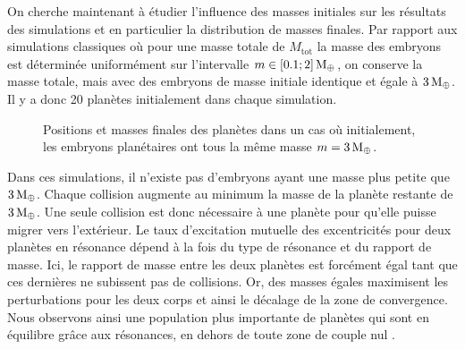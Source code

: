 \bigskip

On cherche maintenant à étudier l'influence des masses initiales sur les résultats des simulations et en particulier la distribution de masses finales. Par rapport aux simulations classiques où pour une masse totale de $M_\text{tot}$ la masse des embryons est déterminée uniformément sur l'intervalle $m\in[0.1 ; 2]\mathrm{\thinspace M_\oplus}$, on conserve la masse totale, mais avec des embryons de masse initiale identique et égale à $3\mathrm{\thinspace M_\oplus}$. Il y a donc 20 planètes initialement dans chaque simulation. 

\begin{figure}[htbp]
\centering
{}\hfill
{}

\caption[Propriétés statistiques quand tous les embryons ont la même masse initialement.]{Positions et masses finales des
planètes dans un cas où initialement, les embryons planétaires ont tous la même masse
$m=3\mathrm{\thinspace M_\oplus}$.}\label{fig:HSE_equal_mass_influence}
\end{figure}

Dans ces simulations, il n'existe pas d'embryons ayant une masse plus petite que $3\mathrm{\thinspace M_\oplus}$. Chaque collision augmente au minimum la masse de la planète restante de $3\mathrm{\thinspace M_\oplus}$. Une seule collision est donc nécessaire à une planète pour qu'elle puisse migrer vers l'extérieur. Le taux d'excitation mutuelle des excentricités pour deux planètes en résonance dépend à la fois du type de résonance et du rapport de masse. Ici, le rapport de masse entre les deux planètes est forcément égal tant que ces dernières ne subissent pas de collisions. Or, des masses égales maximisent les perturbations pour les deux corps et ainsi le décalage de la zone de convergence. Nous observons ainsi une population plus importante de planètes qui sont en équilibre grâce aux résonances, en dehors de toute zone de couple nul . 

